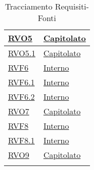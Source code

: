\begin{longtable}{|>{\centering}m{5cm}|m{5cm}<{\centering}|}
\hyperlink{RVO5}{RVO5} & \hyperlink{Capitolato}{Capitolato}\\ \hline

\hyperlink{RVO5.1}{RVO5.1} & \hyperlink{Capitolato}{Capitolato}\\ \hline

\hyperlink{RVF6}{RVF6} & \hyperlink{Interno}{Interno}\\ \hline

\hyperlink{RVF6.1}{RVF6.1} & \hyperlink{Interno}{Interno}\\ \hline

\hyperlink{RVF6.2}{RVF6.2} & \hyperlink{Interno}{Interno}\\ \hline

\hyperlink{RVO7}{RVO7} & \hyperlink{Capitolato}{Capitolato}\\ \hline

\hyperlink{RVF8}{RVF8} & \hyperlink{Interno}{Interno}\\ \hline

\hyperlink{RVF8.1}{RVF8.1} & \hyperlink{Interno}{Interno}\\ \hline

\hyperlink{RVO9}{RVO9} & \hyperlink{Capitolato}{Capitolato}\\ \hline

\caption[Tracciamento Requisiti-Fonti]{Tracciamento Requisiti-Fonti}
\label{tabella:requi-fonti}
\end{longtable}
\clearpage
